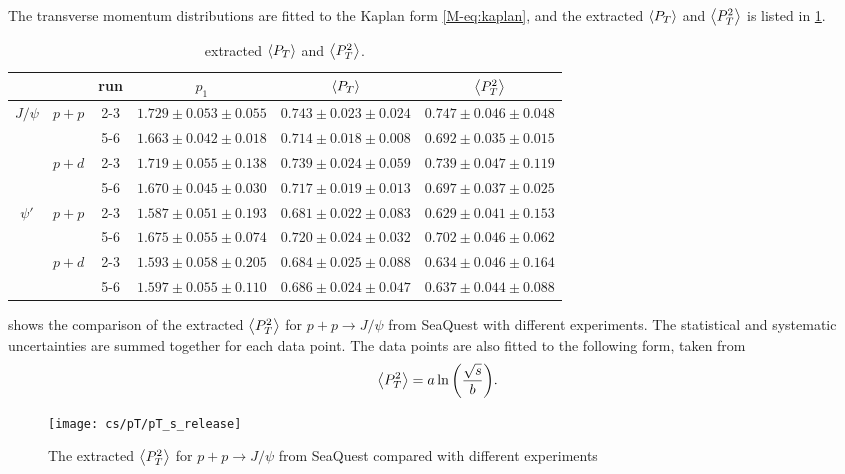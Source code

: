 \documentclass[../main.tex]{subfiles}
\begin{document}
The transverse momentum distributions are fitted to the Kaplan form \cref{M-eq:kaplan}, and the extracted 
$\expval{P_T}$ and $\expval{P^2_T}$ is listed in \cref{tab:kaplan_result}.
\begin{table}[h!]
\centering
\caption{extracted $\expval{P_T}$ and $\expval{P^2_T}$.}
\label{tab:kaplan_result}
\begin{tabular}{cc|c|c|c|c}
\hline
                                               &                        & run & $p_1$                   & $\expval{P_T}$          & $\expval{P^2_T}$        \\ \hline
\multicolumn{1}{c|}{\multirow{4}{*}{$J/\psi$}} & \multirow{2}{*}{$p+p$} & 2-3 & $1.729\pm0.053\pm0.055$ & $0.743\pm0.023\pm0.024$ & $0.747\pm0.046\pm0.048$ \\ \cline{3-6} 
\multicolumn{1}{c|}{}                          &                        & 5-6 & $1.663\pm0.042\pm0.018$ & $0.714\pm0.018\pm0.008$ & $0.692\pm0.035\pm0.015$ \\ \cline{2-6} 
\multicolumn{1}{c|}{}                          & \multirow{2}{*}{$p+d$} & 2-3 & $1.719\pm0.055\pm0.138$ & $0.739\pm0.024\pm0.059$ & $0.739\pm0.047\pm0.119$ \\ \cline{3-6} 
\multicolumn{1}{c|}{}                          &                        & 5-6 & $1.670\pm0.045\pm0.030$ & $0.717\pm0.019\pm0.013$ & $0.697\pm0.037\pm0.025$ \\ \hline
\multicolumn{1}{c|}{\multirow{4}{*}{$\psi'$}}  & \multirow{2}{*}{$p+p$} & 2-3 & $1.587\pm0.051\pm0.193$ & $0.681\pm0.022\pm0.083$ & $0.629\pm0.041\pm0.153$ \\ \cline{3-6} 
\multicolumn{1}{c|}{}                          &                        & 5-6 & $1.675\pm0.055\pm0.074$ & $0.720\pm0.024\pm0.032$ & $0.702\pm0.046\pm0.062$ \\ \cline{2-6} 
\multicolumn{1}{c|}{}                          & \multirow{2}{*}{$p+d$} & 2-3 & $1.593\pm0.058\pm0.205$ & $0.684\pm0.025\pm0.088$ & $0.634\pm0.046\pm0.164$ \\ \cline{3-6} 
\multicolumn{1}{c|}{}                          &                        & 5-6 & $1.597\pm0.055\pm0.110$ & $0.686\pm0.024\pm0.047$ & $0.637\pm0.044\pm0.088$ \\ \hline
\end{tabular}
\end{table}

 shows the comparison of the extracted $\expval{P_T^2}$ for $p+p\rightarrow J/\psi$ from SeaQuest 
with different experiments. The statistical and systematic uncertainties are summed together for each data point. The data points are also fitted to the following form, taken from 
\begin{equation}
	\expval{P_T^2}=a\ln{\left( \frac{\sqrt{s}}{b} \right)}.
\end{equation}
\begin{figure}
	\centering
	\texttt{[image: cs/pT/pT\_s\_release]}
	\caption{The extracted $\expval{P_T^2}$ for $p+p\rightarrow J/\psi$ from SeaQuest compared with different experiments}
	\label{fig:pT_s}
\end{figure}



\ifSubfilesClassLoaded{ \printbibliography[heading=bibintoc,title={References}]}{}
\end{document}
